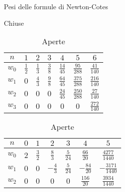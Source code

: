 \begin{table}[H]
\centering
{\renewcommand{\arraystretch}{1.3}%
\caption{Pesi delle formule di Newton-Cotes}
\begin{subtable}{.5\linewidth}
\centering
\caption{Chiuse}
\begin{tabular}{ccccccc}
\toprule
 $n$ & $1$ & $2$ & $3$ & $4$ & $5$ & $6$ \\
\midrule
 $w_{0}$ & $\frac{1}{2}$ & $\frac{1}{3}$ & $\frac{3}{8}$ & $\frac{14}{45}$ & $\frac{95}{288}$ & $\frac{41}{140}$ \\
$w_{1}$ & $0$ & $\frac{4}{3}$ & $\frac{9}{8}$ & $\frac{64}{45}$ & $\frac{375}{288}$ & $\frac{216}{140}$ \\
$w_{2}$ & $0$ & $0$ & $0$ & $\frac{24}{45}$ & $\frac{250}{288}$ & $\frac{27}{140}$ \\
$w_{3}$ & $0$ & $0$ & $0$ & $0$ & $0$ & $\frac{272}{140}$ \\
 \bottomrule
\end{tabular}
\end{subtable}%

\begin{subtable}{.5\linewidth}
\centering
\caption{Aperte}
\begin{tabular}{ccccccc}
\toprule
 $n$ & $0$ & $1$ & $2$ & $3$ & $4$ & $5$ \\
\midrule
 $w_{0}$ & 2 & $\frac{3}{2}$ & $\frac{8}{3}$ & $\frac{5}{24}$ & $\frac{66}{20}$ & $\frac{4277}{1440}$ \\
$w_{1}$ & $0$ & $0$ & $-\frac{4}{3}$ & $\frac{5}{24}$ & $-\frac{84}{20}$ & $-\frac{3171}{1440}$ \\
$w_{2}$ & $0$ & $0$ & $0$ & $0$ & $\frac{156}{20}$ & $\frac{3934}{1440}$ \\
 \bottomrule
\end{tabular}
\end{subtable}%

}
\end{table}

